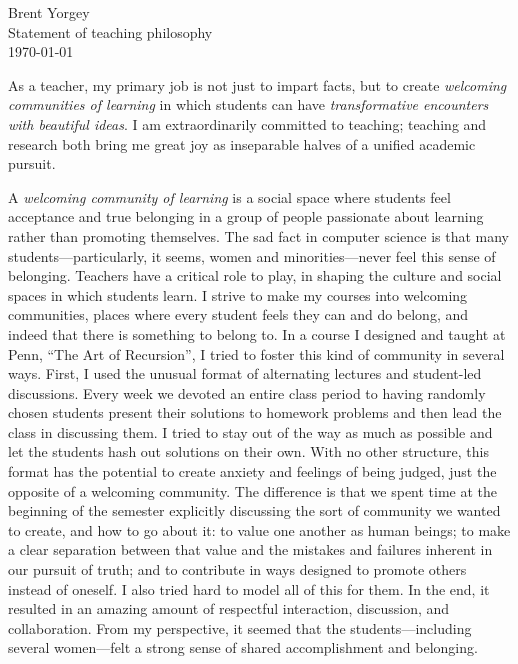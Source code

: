 \documentclass[12pt]{article}
\begin{document}
\noindent Brent Yorgey \\
Statement of teaching philosophy \\
\today
\bigskip

As a teacher, my primary job is not just to impart facts, but to create
\emph{welcoming communities of learning} in which students can have
\emph{transformative encounters with beautiful ideas}.  I am
extraordinarily committed to teaching; teaching and research both
bring me great joy as inseparable halves of a unified academic
pursuit.

A \emph{welcoming community of learning} is a social space where
students feel acceptance and true belonging in a group of people
passionate about learning rather than promoting themselves.  The sad
fact in computer science is that many students---particularly, it
seems, women and minorities---never feel this sense of
belonging. Teachers have a critical role to play, in shaping the
culture and social spaces in which students learn.  I strive to make
my courses into welcoming communities, places where every student
feels they can and do belong, and indeed that there is something to belong
to.  In a course I designed and taught at Penn, ``The Art of
Recursion'', I tried to foster this kind of community in several ways.
First, I used the unusual format of alternating lectures and
student-led discussions. Every week we devoted an entire class period
to having randomly chosen students present their solutions to homework
problems and then lead the class in discussing them.  I tried to stay
out of the way as much as possible and let the students hash out
solutions on their own.  With no other structure, this format has the
potential to create anxiety and feelings of being judged, just the
opposite of a welcoming community.  The difference is that we spent
time at the beginning of the semester explicitly discussing the sort
of community we wanted to create, and how to go about it: to value one
another as human beings; to make a clear separation between that value
and the mistakes and failures inherent in our pursuit of truth; and to
contribute in ways designed to promote others instead of oneself. I
also tried hard to model all of this for them. In the end, it resulted
in an amazing amount of respectful interaction, discussion, and
collaboration. From my perspective, it seemed that the
students---including several women---felt a strong sense of shared
accomplishment and belonging.

\end{document}
